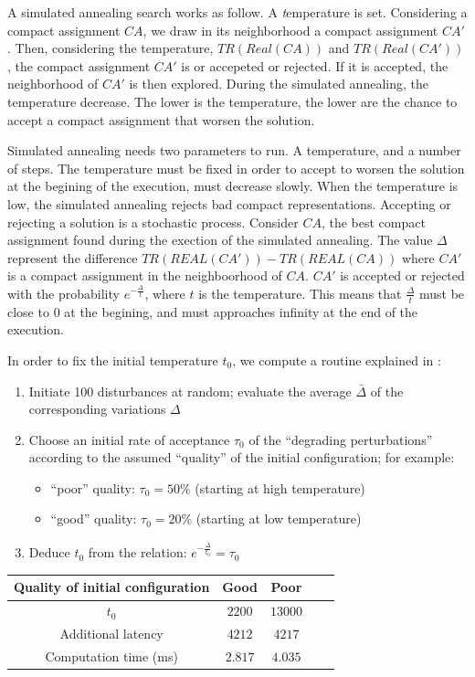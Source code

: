 \documentclass[english]{article}
\begin{document}
A simulated annealing search works as follow. A {\emph temperature} is set. Considering a compact assignment $CA$, we draw in its neighborhood a compact assignment $CA'$. Then, considering the temperature, $TR(Real(CA))$ and $TR(Real(CA'))$, the compact assignment $CA'$ is or accepeted or rejected. If it is accepted, the neighborhood of $CA'$ is then explored. During the simulated annealing, the temperature decrease. The lower is the temperature, the lower are the chance to accept a compact assignment that worsen the solution.

 Simulated annealing needs two parameters to run. A temperature, and a number of steps.
 The temperature must be fixed in order to accept to worsen the solution at the begining of the execution, must decrease slowly. When the temperature is low, the simulated annealing rejects bad compact representations.
 Accepting or rejecting a solution is a stochastic process. Consider $CA$, the best compact assignment found during the exection of the simulated annealing. The value $\Delta$ represent the difference $TR(REAL(CA'))-TR(REAL(CA))$ where $CA'$ is a compact assignment in the neighboorhood of $CA$. $CA'$ is accepted or rejected with the probability $e^{-\frac{\Delta}{t}} $, where $t$ is the temperature.
 This means that $\frac{\Delta}{t}$ must be close to $0$ at the begining, and must approaches infinity at the end of the execution. 
 
 In order to fix the initial temperature $t_0$, we compute a routine explained in \cite{osman1997meta}:
 \begin{enumerate}
  \item Initiate 100 disturbances at random; evaluate the average $\bar{\Delta}$ of the corresponding variations $\Delta$
\item Choose an initial rate of acceptance $\tau_0$ of the “degrading perturbations” according to the assumed “quality” of the initial configuration; for example:
\begin{itemize}
 \item “poor” quality: $\tau_0 = 50 \%$ (starting at high temperature)
\item “good” quality: $\tau_0 = 20 \%$ (starting at low temperature)
\end{itemize}


\item Deduce $t_0$ from the relation: $e^{-\frac{\bar{\Delta}}{t_0}} = \tau_0$ 
 \end{enumerate}
\begin{tabular}{ |c|c|c|c|c| }
\hline
 Quality of initial configuration & Good& Poor\\
    \hline
    $t_0$ & $2200$& $13000$\\
    \hline
    Additional latency & $4212$ & $4217$ \\
        \hline
    Computation time (ms) &  $2.817$&$4.035$ \\

    \hline
 \end{tabular}
 
\end{document}
